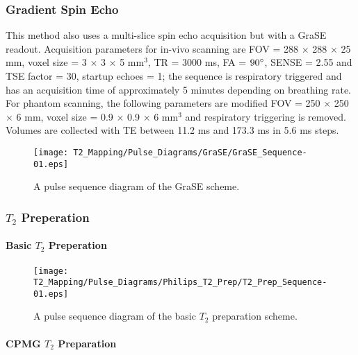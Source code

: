 \subsubsection{Gradient Spin Echo}

This method also uses a multi-slice spin echo acquisition but with a \ac{GraSE} readout. Acquisition parameters for in-vivo scanning are \ac{FOV} = 288 $\times$ 288 $\times$ 25 mm, voxel size = 3 $\times$ 3 $\times$ 5 mm$^3$, \ac{TR} = 3000 ms, \ac{FA} = $90\degree$, \ac{SENSE} = 2.55 and \ac{TSE} factor = 30, startup echoes = 1; the sequence is respiratory triggered and has an acquisition time of approximately 5 minutes depending on breathing rate. For phantom scanning, the following parameters are modified \ac{FOV} = 250 $\times$ 250 $\times$ 6 mm, voxel size = 0.9 $\times$ 0.9 $\times$ 6 mm$^3$ and respiratory triggering is removed. Volumes are collected with \ac{TE} between 11.2 ms and 173.3 ms in 5.6 ms steps.

\begin{figure}[H]
	\centering
	\texttt{[image: T2\_Mapping/Pulse\_Diagrams/GraSE/GraSE\_Sequence-01.eps]}
	\caption{A pulse sequence diagram of the \ac{GraSE} scheme.}
	\label{fig:t2_grase_seq}	
\end{figure}

\subsubsection{$T_2$ Preperation}

\paragraph{Basic $T_2$ Preperation}

\begin{figure}[H]
	\centering
	\texttt{[image: T2\_Mapping/Pulse\_Diagrams/Philips\_T2\_Prep/T2\_Prep\_Sequence-01.eps]}
	\caption{A pulse sequence diagram of the basic $T_2$ preparation scheme.}
	\label{fig:t2_t2prep_seq}	
\end{figure}

\paragraph{CPMG $T_2$ Preparation}

